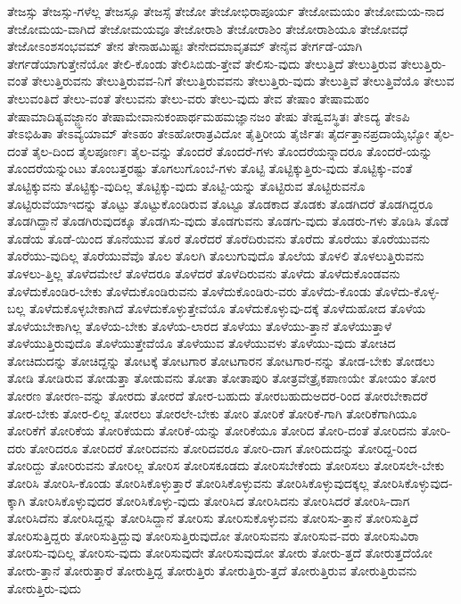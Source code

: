 {ತೇಜಸ್ಸು
ತೇಜಸ್ಸು-ಗಳೆಲ್ಲ
ತೇಜಸ್ಸೂ
ತೇಜಸ್ಸೆ
ತೇಜೋ
ತೇಜೋಭಿರಾಪೂರ್ಯ
ತೇಜೋಮಯಂ
ತೇಜೋಮಯ-ನಾದ
ತೇಜೋಮಯ-ವಾಗಿದೆ
ತೇಜೋಮಯವೂ
ತೇಜೋರಾಶಿ
ತೇಜೋರಾಶಿಂ
ತೇಜೋರಾಶಿಯೂ
ತೇಜೋವಧೆ
ತೇಜೋಽಂಶಸಂಭವಮ್
ತೇನ
ತೇನಾಹಮಿಷ್ಟಃ
ತೇನೇದಮಾವೃತಮ್
ತೇನೈವ
ತೇರ್ಗಡೆ-ಯಾಗಿ
ತೇರ್ಗಡೆಯಾಗುತ್ತೇನೆಯೋ
ತೇಲಿ-ಕೊಂಡು
ತೇಲಿಸಿಬಿಡು-ತ್ತೇವೆ
ತೇಲಿಸು-ವುದು
ತೇಲುತ್ತಿದೆ
ತೇಲುತ್ತಿರುವ
ತೇಲುತ್ತಿರು-ವಂತೆ
ತೇಲುತ್ತಿರುವನು
ತೇಲುತ್ತಿರುವವ-ನಿಗೆ
ತೇಲುತ್ತಿರುವವನು
ತೇಲುತ್ತಿರು-ವುದು
ತೇಲುತ್ತಿವೆ
ತೇಲುತ್ತಿವೆಯೊ
ತೇಲುವ
ತೇಲುವಂತಿದೆ
ತೇಲು-ವಂತೆ
ತೇಲುವನು
ತೇಲು-ವರು
ತೇಲು-ವುದು
ತೇವ
ತೇಷಾಂ
ತೇಷಾಮಹಂ
ತೇಷಾಮಾದಿತ್ಯವಜ್ಜ್ಞಾನಂ
ತೇಷಾಮೇವಾನುಕಂಪಾರ್ಥಮಹಮಜ್ಞಾನಜಂ
ತೇಷು
ತೇಷ್ವವಸ್ಥಿತಃ
ತೇಽದ್ಯ
ತೇಽಪಿ
ತೇಽಭಿಹಿತಾ
ತೇಽವ್ಯಯಾಮ್
ತೇಽಹಂ
ತೇಽಹೋರಾತ್ರವಿದೋ
ತೈತ್ತಿರೀಯ
ತೈರ್ಜಿತಃ
ತೈರ್ದತ್ತಾನಪ್ರದಾಯೈಭ್ಯೋ
ತೈಲ-ದಂತೆ
ತೈಲ-ದಿಂದ
ತೈಲಪೂರ್ಣಃ
ತೈಲ-ವನ್ನು
ತೊಂದರೆ
ತೊಂದರೆ-ಗಳು
ತೊಂದರೆಯನ್ನಾದರೂ
ತೊಂದರೆ-ಯನ್ನು
ತೊಂದರೆಯನ್ನುಂಟು
ತೊಂಬತ್ತರಷ್ಟು
ತೊಗಲುಗೊಂಬೆ-ಗಳು
ತೊಟ್ಟಿ
ತೊಟ್ಟಿಕ್ಕುತ್ತಿರು-ವುದು
ತೊಟ್ಟಿಕ್ಕು-ವಂತೆ
ತೊಟ್ಟಿಕ್ಕುವನು
ತೊಟ್ಟಿಕ್ಕು-ವುದಿಲ್ಲ
ತೊಟ್ಟಿಕ್ಕು-ವುದು
ತೊಟ್ಟಿ-ಯನ್ನು
ತೊಟ್ಟಿರುವ
ತೊಟ್ಟಿರುವನೊ
ತೊಟ್ಟಿರುವೆಯಾಇದನ್ನು
ತೊಟ್ಟು
ತೊಟ್ಟುಕೊಂಡಿರುವ
ತೊಟ್ಟೂ
ತೊಡಕಾದ
ತೊಡಕು
ತೊಡಗಿದರೆ
ತೊಡಗಿದ್ದರೂ
ತೊಡಗಿದ್ದಾನೆ
ತೊಡಗಿರುವುದಕ್ಕೂ
ತೊಡಗಿಸು-ವುದು
ತೊಡಗುವನು
ತೊಡಗು-ವುದು
ತೊಡರು-ಗಳು
ತೊಡಿಸಿ
ತೊಡೆ
ತೊಡೆಯ
ತೊಡೆ-ಯಿಂದ
ತೊನೆಯುವ
ತೊರೆ
ತೊರೆದರೆ
ತೊರೆದಿರುವನು
ತೊರೆದು
ತೊರೆಯು
ತೊರೆಯುವನು
ತೊರೆಯು-ವುದಿಲ್ಲ
ತೊರೆಯುವೆವೊ
ತೊಲ
ತೊಲಗಿ
ತೊಲುಗುವುದೊ
ತೊಲೆಯ
ತೊಳಲಿ
ತೊಳಲುತ್ತಿರುವನು
ತೊಳಲು-ತ್ತಿಲ್ಲ
ತೊಳೆದಮೇಲೆ
ತೊಳೆದರೂ
ತೊಳೆದರೆ
ತೊಳೆದಿರುವನು
ತೊಳೆದು
ತೊಳೆದುಕೊಂಡವನು
ತೊಳೆದುಕೊಂಡಿರ-ಬೇಕು
ತೊಳೆದುಕೊಂಡಿರುವನು
ತೊಳೆದುಕೊಂಡಿರು-ವರು
ತೊಳೆದು-ಕೊಂಡು
ತೊಳೆದು-ಕೊಳ್ಳ-ಬಲ್ಲ
ತೊಳೆದುಕೊಳ್ಳಬೇಕಾಗಿದೆ
ತೊಳೆದುಕೊಳ್ಳುತ್ತೇವೆಯೊ
ತೊಳೆದುಕೊಳ್ಳುವು-ದಕ್ಕೆ
ತೊಳೆದುಹೋದ
ತೊಳೆಯ
ತೊಳೆಯಬೇಕಾಗಿಲ್ಲ
ತೊಳೆಯ-ಬೇಕು
ತೊಳೆಯ-ಲಾರದ
ತೊಳೆಯು
ತೊಳೆಯು-ತ್ತಾನೆ
ತೊಳೆಯುತ್ತಾಳೆ
ತೊಳೆಯುತ್ತಿರುವುದೊ
ತೊಳೆಯುತ್ತೇವೆಯೊ
ತೊಳೆಯುವ
ತೊಳೆಯುವಳು
ತೊಳೆಯು-ವುದು
ತೋಚಿದ
ತೋಚಿದುದನ್ನು
ತೋಚಿದ್ದನ್ನು
ತೋಟಕ್ಕೆ
ತೋಟಗಾರ
ತೋಟಗಾರನ
ತೋಟಗಾರ-ನನ್ನು
ತೋಡ-ಬೇಕು
ತೋಡಲು
ತೋಡಿ
ತೋಡಿರುವ
ತೋಡುತ್ತಾ
ತೋಡುವನು
ತೋತಾ
ತೋತಾಪುರಿ
ತೋತ್ರವೇತ್ರೈಕಪಾಣಯೇ
ತೋಯಂ
ತೋರ
ತೋರಣ
ತೋರಣ-ವನ್ನು
ತೋರದು
ತೋರದೆ
ತೋರ-ಬಹುದು
ತೋರಬಹುದುಅದರ-ರಿಂದ
ತೋರಬೇಕಾದರೆ
ತೋರ-ಬೇಕು
ತೋರ-ಲಿಲ್ಲ
ತೋರಲು
ತೋರಲೇ-ಬೇಕು
ತೋರಿ
ತೋರಿಕೆ
ತೋರಿಕೆ-ಗಾಗಿ
ತೋರಿಕೆಗಾಗಿಯೂ
ತೋರಿಕೆಗೆ
ತೋರಿಕೆಯ
ತೋರಿಕೆಯದು
ತೋರಿಕೆ-ಯನ್ನು
ತೋರಿಕೆಯೂ
ತೋರಿದ
ತೋರಿ-ದಂತೆ
ತೋರಿದನು
ತೋರಿ-ದರು
ತೋರಿದರೂ
ತೋರಿದರೆ
ತೋರಿದವನು
ತೋರಿದವರೂ
ತೋರಿ-ದಾಗ
ತೋರಿದುದನ್ನು
ತೋರಿದ್ದ-ರಿಂದ
ತೋರಿದ್ದು
ತೋರಿರುವನು
ತೋರಿಲ್ಲ
ತೋರಿಸ
ತೋರಿಸಕೂಡದು
ತೋರಿಸಬೇಕೆಂದು
ತೋರಿಸಲು
ತೋರಿಸಲೇ-ಬೇಕು
ತೋರಿಸಿ
ತೋರಿಸಿ-ಕೊಂಡು
ತೋರಿಸಿಕೊಳ್ಳುತ್ತಾರೆ
ತೋರಿಸಿಕೊಳ್ಳುವನು
ತೋರಿಸಿಕೊಳ್ಳುವುದಕ್ಕಲ್ಲ
ತೋರಿಸಿಕೊಳ್ಳುವುದ-ಕ್ಕಾಗಿ
ತೋರಿಸಿಕೊಳ್ಳುವುದರ
ತೋರಿಸಿಕೊಳ್ಳು-ವುದು
ತೋರಿಸಿದ
ತೋರಿಸಿದನು
ತೋರಿಸಿದರೆ
ತೋರಿಸಿ-ದಾಗ
ತೋರಿಸಿದೆನು
ತೋರಿಸಿದ್ದನ್ನು
ತೋರಿಸಿದ್ದಾನೆ
ತೋರಿಸು
ತೋರಿಸುಕೊಳ್ಳುವನು
ತೋರಿಸು-ತ್ತಾನೆ
ತೋರಿಸುತ್ತಿದೆ
ತೋರಿಸುತ್ತಿದ್ದರು
ತೋರಿಸುತ್ತಿದ್ದುವು
ತೋರಿಸುತ್ತಿರುವುದೋ
ತೋರಿಸುವನು
ತೋರಿಸುವ-ವರು
ತೋರಿಸುವಿರಾ
ತೋರಿಸು-ವುದಿಲ್ಲ
ತೋರಿಸು-ವುದು
ತೋರಿಸುವುದೇ
ತೋರಿಸುವುದೋ
ತೋರು
ತೋರು-ತ್ತದೆ
ತೋರುತ್ತದೆಯೋ
ತೋರು-ತ್ತಾನೆ
ತೋರುತ್ತಾರೆ
ತೋರುತ್ತಿದ್ದ
ತೋರುತ್ತಿರು
ತೋರುತ್ತಿರು-ತ್ತದೆ
ತೋರುತ್ತಿರುವ
ತೋರುತ್ತಿರುವನು
ತೋರುತ್ತಿರು-ವುದು
}
